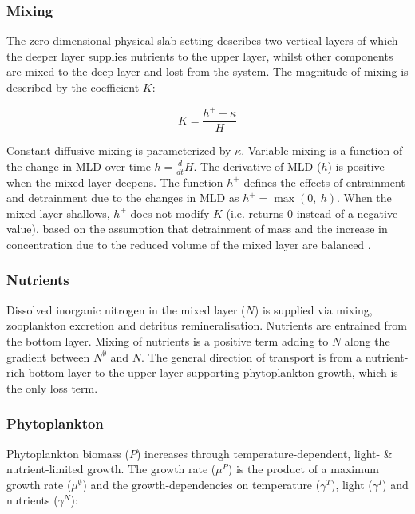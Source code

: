 \documentclass[journal abbreviations, manuscript]{copernicus}
\begin{document}


\subsubsection{Mixing}

The zero-dimensional physical slab setting describes two vertical layers of which the deeper layer supplies nutrients to the upper layer, whilst other components are mixed to the deep layer and lost from the system.
The magnitude of mixing is described by the coefficient $K$:

\begin{equation}
    K = \frac{h^{+} + \kappa}{H}
\end{equation}

Constant diffusive mixing is parameterized by $\kappa$. Variable mixing is a function of the change in MLD over time $h = \frac{d}{d t} H$. The derivative of MLD ($h$) is positive when the mixed layer deepens. The function $h^{+}$ defines the effects of entrainment and detrainment due to the changes in MLD as $h^{+} = \max(0, \ h)$. When the mixed layer shallows, $h^{+}$ does not modify $K$ (i.e. returns 0 instead of a negative value), based on the assumption that detrainment of mass and the increase in concentration due to the reduced volume of the mixed layer are balanced \citep{Evans1985ACycles}. 

\subsubsection{Nutrients}
Dissolved inorganic nitrogen in the mixed layer ($N$) is supplied via mixing, zooplankton excretion and detritus remineralisation.
Nutrients are entrained from the bottom layer. Mixing of nutrients is a positive term adding to $N$ along the gradient between $N^\emptyset$ and $N$. The general direction of transport is from a nutrient-rich bottom layer to the upper layer supporting phytoplankton growth, which is the only loss term.

\subsubsection{Phytoplankton}
Phytoplankton biomass ($P$) increases through temperature-dependent, light- \& nutrient-limited growth. The growth rate ($\mu^{P}$) is the product of a maximum growth rate ($\mu^{\emptyset}$) and the growth-dependencies on temperature ($\gamma^{T}$), light ($\gamma^{I}$) and nutrients ($\gamma^{N}$): 
\end{document}
